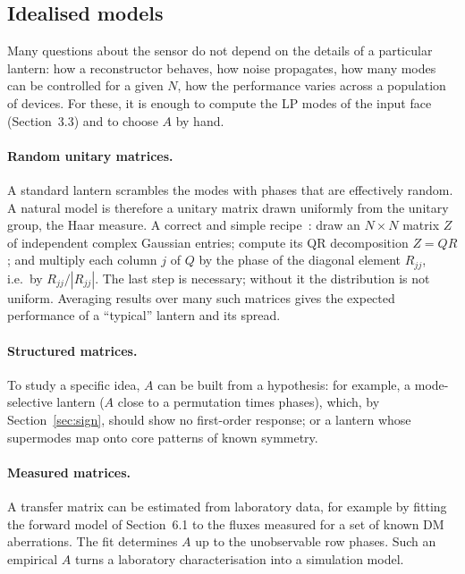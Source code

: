 \documentclass[11pt,a4paper]{article}
\begin{document}
\subsection{Idealised models}
Many questions about the sensor do not depend on the details of a particular lantern: how a reconstructor behaves, how noise propagates, how many modes can be controlled for a given $N$, how the performance varies across a population of devices. For these, it is enough to compute the LP modes of the input face (Section~3.3) and to choose $A$ by hand.

\paragraph{Random unitary matrices.} A standard lantern scrambles the modes with phases that are effectively random. A natural model is therefore a unitary matrix drawn uniformly from the unitary group, the Haar measure. A correct and simple recipe~\cite{Mezzadri2007}: draw an $N\times N$ matrix $Z$ of independent complex Gaussian entries; compute its QR decomposition $Z = QR$; and multiply each column $j$ of $Q$ by the phase of the diagonal element $R_{jj}$, i.e.\ by $R_{jj}/|R_{jj}|$. The last step is necessary; without it the distribution is not uniform. Averaging results over many such matrices gives the expected performance of a ``typical'' lantern and its spread.

\paragraph{Structured matrices.} To study a specific idea, $A$ can be built from a hypothesis: for example, a mode-selective lantern ($A$ close to a permutation times phases), which, by Section~\ref{sec:sign}, should show no first-order response; or a lantern whose supermodes map onto core patterns of known symmetry.

\paragraph{Measured matrices.} A transfer matrix can be estimated from laboratory data, for example by fitting the forward model of Section~6.1 to the fluxes measured for a set of known DM aberrations. The fit determines $A$ up to the unobservable row phases. Such an empirical $A$ turns a laboratory characterisation into a simulation model.
\end{document}

